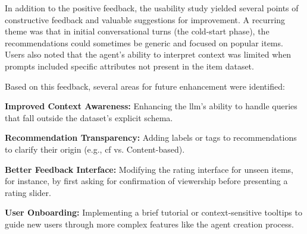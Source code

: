 In addition to the positive feedback, the usability study yielded several points of constructive feedback and valuable suggestions for improvement. A recurring theme was that in initial conversational turns (the cold-start phase), the recommendations could sometimes be generic and focused on popular items. Users also noted that the agent's ability to interpret context was limited when prompts included specific attributes not present in the item dataset.

Based on this feedback, several areas for future enhancement were identified:
\begin{compactitem}[\textbullet]
    \item \textbf{Improved Context Awareness:} Enhancing the \ac{llm}'s ability to handle queries that fall outside the dataset's explicit schema.
    \item \textbf{Recommendation Transparency:} Adding labels or tags to recommendations to clarify their origin (e.g., \acl{cf} vs. Content-based).
    \item \textbf{Better Feedback Interface:} Modifying the rating interface for unseen items, for instance, by first asking for confirmation of viewership before presenting a rating slider.
    \item \textbf{User Onboarding:} Implementing a brief tutorial or context-sensitive tooltips to guide new users through more complex features like the agent creation process.
\end{compactitem}

\newpage